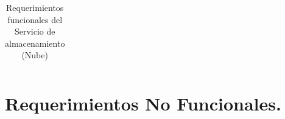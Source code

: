 \begin{table}[htb]
\begin{tabular}{| p{2cm} |  p{13.5cm} |}
\end{tabular}
\caption{Requerimientos funcionales del Servicio de almacenamiento (Nube)}
\label{Servicio de almacenamiento (Nube) }
\end{table}

\section{Requerimientos No Funcionales. }

